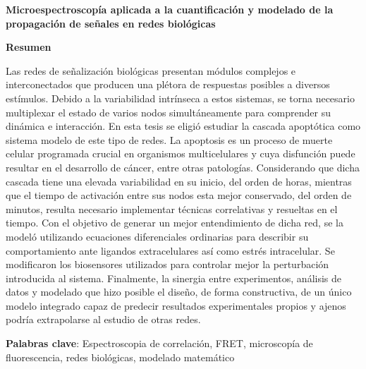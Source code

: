 

\begin{center}
    {\bf \Large  Microespectroscopía aplicada a la cuantificación y modelado de la propagación de señales en redes biológicas\\}
    
    \vspace{4cm}
    
    
    \textbf{Resumen}
    
    Las redes de señalización biológicas presentan módulos complejos e interconectados que producen una plétora de respuestas posibles a diversos estímulos. Debido a la variabilidad intrínseca a estos sistemas, se torna necesario multiplexar el estado de varios nodos simultáneamente para comprender su dinámica e interacción. En esta tesis se eligió estudiar la cascada apoptótica como sistema modelo de este tipo de redes. La apoptosis es un proceso de muerte celular programada crucial en organismos multicelulares y cuya disfunción puede resultar en el desarrollo de cáncer, entre otras patologías. Considerando que dicha cascada tiene una elevada variabilidad en su inicio, del orden de horas, mientras que el tiempo de activación entre sus nodos esta mejor conservado, del orden de minutos, resulta necesario implementar técnicas correlativas y resueltas en el tiempo. Con el objetivo de generar un mejor entendimiento de dicha red, se la modeló utilizando ecuaciones diferenciales ordinarias para describir su comportamiento ante ligandos extracelulares así como estrés intracelular. Se modificaron los biosensores utilizados para controlar mejor la perturbación introducida al sistema. Finalmente, la sinergia entre experimentos, análisis de datos y modelado que hizo posible el diseño, de forma constructiva, de un único modelo integrado capaz de predecir resultados experimentales propios y ajenos podría extrapolarse al estudio de otras redes.
    \vspace{2cm}
    
    
\end{center}


\textbf{Palabras clave}: Espectroscopia de correlación, FRET, microscopía de fluorescencia, redes biológicas, modelado matemático

\cleardoublepage


